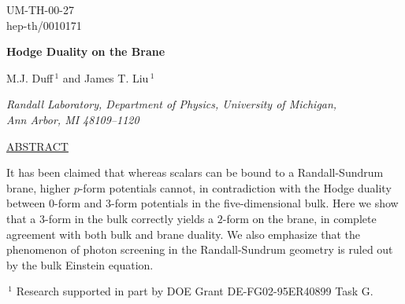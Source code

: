 \documentclass[a4paper,12pt]{article}
\def\hoch#1{$\, ^{#1}$}
\begin{document}

\begin{flushright}
UM-TH-00-27\\
hep-th/0010171\\
\end{flushright}

\vspace{40pt}

\begin{center}

{\bf Hodge Duality on the Brane}

\vspace{20pt}

M.J. Duff\hoch{1} and
James T. Liu\hoch{1}


\vspace{10pt}
{\it
Randall Laboratory, Department of Physics, University of Michigan,\\
Ann Arbor, MI 48109--1120}


\vspace{30pt}


\underline{ABSTRACT}
\end{center}
\noindent
It has been claimed that whereas scalars can be bound to a
Randall-Sundrum brane, higher $p$-form potentials cannot, in
contradiction with the Hodge duality between $0$-form and
$3$-form potentials in the five-dimensional bulk. Here we show
that a $3$-form in the bulk correctly yields a $2$-form on the
brane, in complete agreement with both bulk and brane duality.
We also emphasize that the phenomenon of photon screening in the
Randall-Sundrum geometry is ruled out by the bulk Einstein equation.

{\vfill\leftline{}\vfill
\vskip 10pt \footnoterule
{\footnotesize\noindent\hoch{1}
Research supported in part by DOE Grant DE-FG02-95ER40899 Task G.
\vskip  -12pt} \vskip   14pt
}

\newpage

\end{document}
